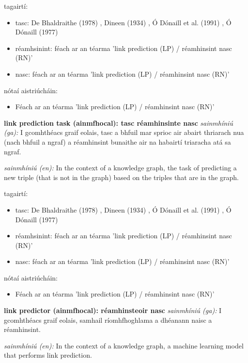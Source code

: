 \documentclass{article}
\begin{document}
tagairtí:
\begin{itemize}
	\item tasc: De Bhaldraithe (1978) \cite{de-bhaldraithe}, Dineen (1934) \cite{dineen}, Ó Dónaill et al. (1991) \cite{focloir-beag}, Ó Dónaill (1977) \cite{odonaill}
	\item réamhsinint: féach ar an téarma 'link prediction (LP) / réamhinsint nasc (RN)'
	\item nasc: féach ar an téarma 'link prediction (LP) / réamhinsint nasc (RN)'
\end{itemize}

nótaí aistriúcháin:
\begin{itemize}
	\item Féach ar an téarma 'link prediction (LP) / réamhinsint nasc (RN)'
\end{itemize}


\textbf{link prediction task (ainmfhocal): tasc réamhinsinte nasc}
\textit{sainmhíniú (ga):} I gcomhthéacs graif eolais, tasc a bhfuil mar sprioc air abairt thriarach nua (nach bhfuil a ngraf) a réamhinsint bunaithe air na habairtí triaracha atá sa ngraf.

\textit{sainmhíniú (en):} In the context of a knowledge graph, the task of predicting a new triple (that is not in the graph) based on the triples that are in the graph.

tagairtí:
\begin{itemize}
	\item tasc: De Bhaldraithe (1978) \cite{de-bhaldraithe}, Dineen (1934) \cite{dineen}, Ó Dónaill et al. (1991) \cite{focloir-beag}, Ó Dónaill (1977) \cite{odonaill}
	\item réamhsinint: féach ar an téarma 'link prediction (LP) / réamhinsint nasc (RN)'
	\item nasc: féach ar an téarma 'link prediction (LP) / réamhinsint nasc (RN)'
\end{itemize}

nótaí aistriúcháin:
\begin{itemize}
	\item Féach ar an téarma 'link prediction (LP) / réamhinsint nasc (RN)'
\end{itemize}


\textbf{link predictor (ainmfhocal): réamhinsteoir nasc}
\textit{sainmhíniú (ga):} I gcomhthéacs graif eolais, samhail ríomhfhoghlama a dhéanann naisc a réamhinsint.

\textit{sainmhíniú (en):} In the context of a knowledge graph, a machine learning model that performs link prediction.
\end{document}
